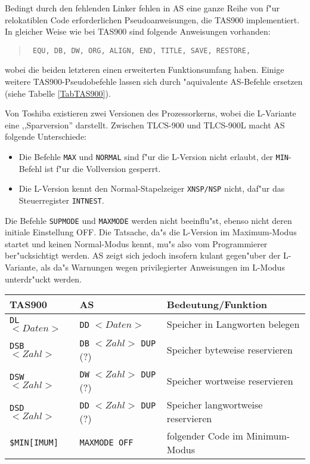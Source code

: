\documentclass[12pt,a4paper,twoside]{report}
\newcommand{\tty}[1]{{\tt #1}}
\begin{document}
{Bedingt durch den fehlenden Linker fehlen in AS eine ganze Reihe von f"ur
relokatiblen Code erforderlichen Pseudoanweisungen, die TAS900 implementiert.
In gleicher Weise wie bei TAS900 sind folgende Anweisungen vorhanden:
\begin{quote}{\tt
EQU, DB, DW, ORG, ALIGN, END, TITLE, SAVE, RESTORE,
}\end{quote}
wobei die beiden letzteren einen erweiterten Funktionsumfang haben.
Einige weitere TAS900-Pseudobefehle lassen sich durch "aquivalente AS-Befehle
ersetzen (siehe Tabelle \ref{TabTAS900}).
\par
Von Toshiba existieren zwei Versionen des Prozessorkerns, wobei die
L-Variante eine ,,Sparversion'' darstellt.  Zwischen TLCS-900 und TLCS-900L
macht AS folgende Unterschiede:
\begin{itemize}
\item{Die Befehle \tty{MAX} und \tty{NORMAL} sind f"ur die L-Version
      nicht erlaubt, der \tty{MIN}-Befehl ist f"ur die Vollversion
      gesperrt.}
\item{Die L-Version kennt den Normal-Stapelzeiger \tty{XNSP/NSP} nicht,
      daf"ur das Steuerregister \tty{INTNEST}.}
\end{itemize}
Die Befehle \tty{SUPMODE} und \tty{MAXMODE} werden nicht beeinflu"st,
ebenso nicht deren ini\-tiale Einstellung OFF.  Die Tatsache, da"s die
L-Version im Maximum-Modus startet und keinen Normal-Modus kennt, mu"s
also vom Programmierer ber"ucksichtigt werden.  AS zeigt sich jedoch
insofern kulant gegen"uber der L-Variante, als da"s Warnungen wegen
privilegierter Anweisungen im L-Modus unterdr"uckt werden.
\begin{table*}[htbp]
\begin{center}\begin{tabular}{|l|l|l|}
\hline
TAS900        &   AS                & Bedeutung/Funktion \\
\hline
\hline
\tty{DL} $<Daten>$  & \tty{DD} $<Daten>$              & Speicher in Langworten belegen \\
\hline
\tty{DSB} $<Zahl>$  & \tty{DB} $<Zahl>$ \tty{DUP} (?) & Speicher byteweise reservieren \\
\hline
\tty{DSW} $<Zahl>$  & \tty{DW} $<Zahl>$ \tty{DUP} (?) & Speicher wortweise reservieren \\
\hline
\tty{DSD} $<Zahl>$  & \tty{DD} $<Zahl>$ \tty{DUP} (?) & Speicher langwortweise reservieren \\
\hline
\tty{\$MIN[IMUM]}   & \tty{MAXMODE OFF}         & folgender Code im Minimum-Modus \\

\end{tabular}
\end{center}
\end{table*}}
\end{document}
